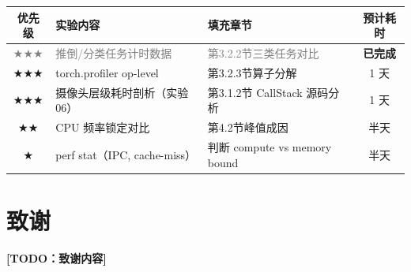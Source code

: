 \documentclass[12pt, a4paper, fontset=macnew]{ctexart}
\newcommand{\mytodo}[1]{\textcolor{orange!80!black}{\small\bfseries [TODO：#1]}}
\begin{document}
\begin{center}
\begin{tabular}{cp{4cm}p{3.5cm}c}
  \toprule
  优先级 & 实验内容 & 填充章节 & 预计耗时 \\
  \midrule
  \textcolor{gray}{$\bigstar\bigstar\bigstar$} & \textcolor{gray}{推倒/分类任务计时数据} & \textcolor{gray}{第3.2.2节三类任务对比} & \textbf{已完成} \\
  $\bigstar\bigstar\bigstar$ & torch.profiler op-level & 第3.2.3节算子分解 & 1 天 \\
  $\bigstar\bigstar\bigstar$ & 摄像头层级耗时剖析（实验06） & 第3.1.2节 CallStack 源码分析 & 1 天 \\
  $\bigstar\bigstar$         & CPU 频率锁定对比 & 第4.2节峰值成因 & 半天 \\
  $\bigstar$                 & perf stat（IPC, cache-miss） & 判断 compute vs memory bound & 半天 \\
  \bottomrule
\end{tabular}
\end{center}

\clearpage
\section*{致\quad 谢}

\mytodo{致谢内容}
\end{document}
